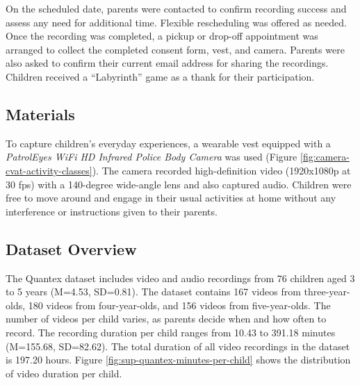 \documentclass[
  man,floatsintext]{apa6}
\begin{document}
On the scheduled date, parents were contacted to confirm recording success and assess any need for additional time. Flexible rescheduling was offered as needed. Once the recording was completed, a pickup or drop-off appointment was arranged to collect the completed consent form, vest, and camera. Parents were also asked to confirm their current email address for sharing the recordings. Children received a ``Labyrinth'' game as a thank for their participation.

\subsection{Materials}\label{sup-materials}

To capture children's everyday experiences, a wearable vest equipped with a \emph{PatrolEyes WiFi HD Infrared Police Body Camera} was used (Figure \ref{fig:camera-cvat-activity-classes}). The camera recorded high-definition video (1920x1080p at 30 fps) with a 140-degree wide-angle lens and also captured audio. Children were free to move around and engage in their usual activities at home without any interference or instructions given to their parents.

\subsection{Dataset Overview}\label{sup-dataset}

The Quantex dataset includes video and audio recordings from 76 children aged 3 to 5 years (M=4.53, SD=0.81). The dataset contains 167 videos from three-year-olds, 180 videos from four-year-olds, and 156 videos from five-year-olds. The number of videos per child varies, as parents decide when and how often to record. The recording duration per child ranges from 10.43 to 391.18 minutes (M=155.68, SD=82.62). The total duration of all video recordings in the dataset is 197.20 hours. Figure \ref{fig:sup-quantex-minutes-per-child} shows the distribution of video duration per child.
\end{document}
